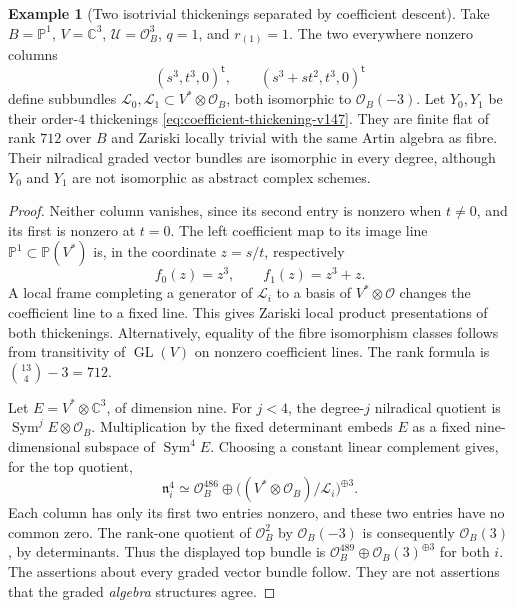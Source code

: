\documentclass[11pt,reqno]{amsart}
\numberwithin{equation}{section}
\theoremstyle{definition}\newtheorem{definition}[theorem]{Definition}
\newtheorem{example}[theorem]{Example}
\theoremstyle{remark}\newtheorem{remark}[theorem]{Remark}
\newcommand{\C}{\mathbb C}\newcommand{\Q}{\mathbb Q}
\newcommand{\Pj}{\mathbb P}\newcommand{\A}{\mathbb A}
\newcommand{\OO}{\mathcal O}\newcommand{\II}{\mathcal I}
\DeclareMathOperator{\Sym}{Sym}\DeclareMathOperator{\Gr}{Gr}
\begin{document}
\begin{example}[Two isotrivial thickenings separated by coefficient descent]
\label{ex:isotrivial-covers-v147}
Take \(B=\Pj^1\), \(V=\C^3\), \(\mathcal U=\OO_B^3\),
\(q=1\), and \(r_{(1)}=1\).  The two everywhere nonzero columns
\[
 (s^3,t^3,0)^{\mathsf t},\qquad
 (s^3+st^2,t^3,0)^{\mathsf t}
\]
define subbundles \(\mathcal L_0,\mathcal L_1\subset V^*\otimes\OO_B\),
both isomorphic to \(\OO_B(-3)\).  Let \(Y_0,Y_1\) be their
order-\(4\) thickenings \eqref{eq:coefficient-thickening-v147}.
They are finite flat of rank \(712\) over \(B\) and Zariski
locally trivial with the same Artin algebra as fibre.  Their
nilradical graded vector bundles are isomorphic in every degree,
although \(Y_0\) and \(Y_1\) are not isomorphic as abstract
complex schemes.
\end{example}
\begin{proof}
Neither column vanishes, since its second entry is nonzero when
\(t\ne0\), and its first is nonzero at \(t=0\).  The left
coefficient map to its image line \(\Pj^1\subset\Pj(V^*)\)
is, in the coordinate \(z=s/t\), respectively
\[
                        f_0(z)=z^3,\qquad f_1(z)=z^3+z.
\]
A local frame completing a generator of \(\mathcal L_i\) to a
basis of \(V^*\otimes\OO\) changes the coefficient line to a
fixed line.  This gives Zariski local product presentations of both
thickenings.  Alternatively, equality of the fibre isomorphism
classes follows from transitivity of \(\operatorname{GL}(V)\)
on nonzero coefficient lines.  The rank formula is
\(\binom{13}{4}-3=712\).

Let \(E=V^*\otimes\C^3\), of dimension nine.  For \(j<4\),
the degree-\(j\) nilradical quotient is \(\Sym^j E\otimes\OO_B\).
Multiplication by the fixed determinant embeds \(E\) as a fixed
nine-dimensional subspace of \(\Sym^4 E\).  Choosing a constant
linear complement gives, for the top quotient,
\[
 \mathfrak n_i^4\simeq
 \OO_B^{486}\oplus
           \bigl((V^*\otimes\OO_B)/\mathcal L_i\bigr)^{\oplus3}.
\]
Each column has only its first two entries nonzero, and these two
entries have no common zero.  The rank-one quotient of \(\OO_B^2\)
by \(\OO_B(-3)\) is consequently \(\OO_B(3)\), by determinants.
Thus the displayed top bundle is
\(\OO_B^{489}\oplus\OO_B(3)^{\oplus3}\) for both \(i\).
The assertions about every graded vector bundle follow.  They are
not assertions that the graded \emph{algebra} structures agree.


\end{proof}
\end{document}

